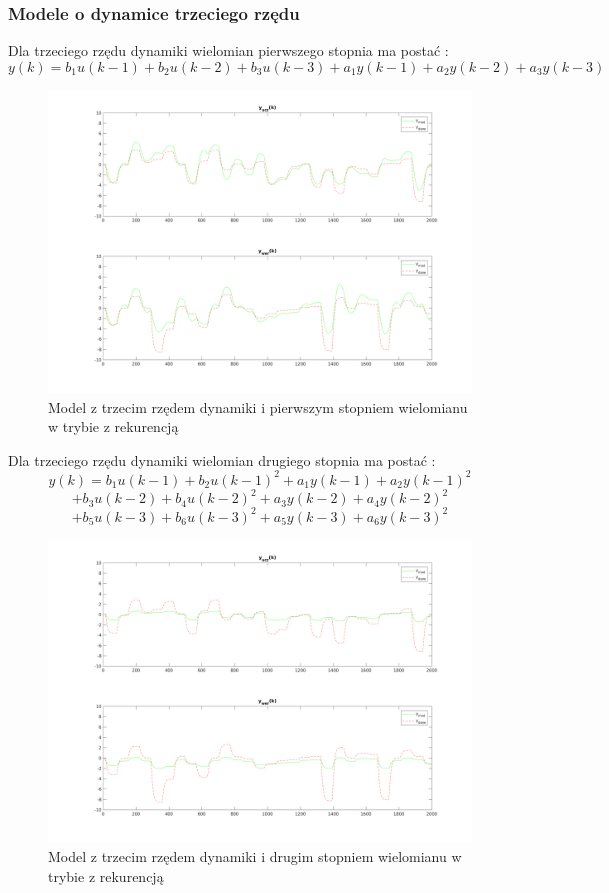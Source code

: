 \documentclass[a4paper, 11pt]{article}
\begin{document}
\subsubsection{Modele o dynamice trzeciego rzędu}
Dla trzeciego rzędu dynamiki wielomian pierwszego stopnia ma postać : 
$$y(k) = b_1u(k-1)+b_2u(k-2)+b_3u(k-3) + a_1y(k-1)+a_2y(k-2)+a_3y(k-3)$$
\begin{figure}[H]
\centering
\includegraphics[scale=0.50]{dane_dyn_mod_rek_D_3N_1.png}
\caption{Model z trzecim rzędem dynamiki i pierwszym stopniem wielomianu w trybie z rekurencją }
\label{}
\end{figure}

Dla trzeciego rzędu dynamiki wielomian drugiego stopnia ma postać : 
$$y(k) = b_1u(k-1)+b_2u(k-1)^2 + a_1y(k-1)+ a_2y(k-1)^2$$
$$+b_3u(k-2)+b_4u(k-2)^2 + a_3y(k-2)+ a_4y(k-2)^2$$
$$+b_5u(k-3)+b_6u(k-3)^2 + a_5y(k-3)+ a_6y(k-3)^2$$
\begin{figure}[H]
\centering
\includegraphics[scale=0.50]{dane_dyn_mod_rek_D_3N_2.png}
\caption{Model z trzecim rzędem dynamiki i drugim stopniem wielomianu w trybie z rekurencją }
\label{}
\end{figure}
\end{document}

